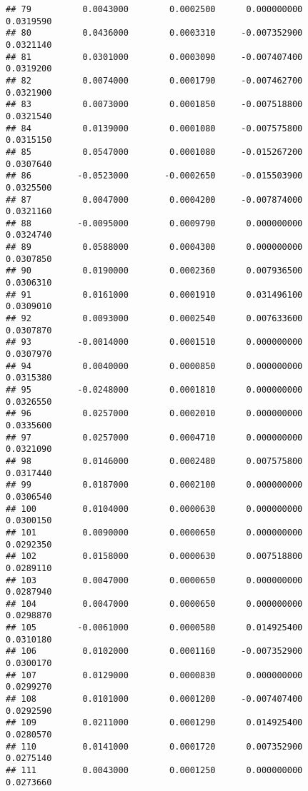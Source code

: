 \documentclass[
]{article}
\begin{document}
\begin{verbatim}
## 79          0.0043000        0.0002500      0.000000000             0.0319590
## 80          0.0436000        0.0003310     -0.007352900             0.0321140
## 81          0.0301000        0.0003090     -0.007407400             0.0319200
## 82          0.0074000        0.0001790     -0.007462700             0.0321900
## 83          0.0073000        0.0001850     -0.007518800             0.0321540
## 84          0.0139000        0.0001080     -0.007575800             0.0315150
## 85          0.0547000        0.0001080     -0.015267200             0.0307640
## 86         -0.0523000       -0.0002650     -0.015503900             0.0325500
## 87          0.0047000        0.0004200     -0.007874000             0.0321160
## 88         -0.0095000        0.0009790      0.000000000             0.0324740
## 89          0.0588000        0.0004300      0.000000000             0.0307850
## 90          0.0190000        0.0002360      0.007936500             0.0306310
## 91          0.0161000        0.0001910      0.031496100             0.0309010
## 92          0.0093000        0.0002540      0.007633600             0.0307870
## 93         -0.0014000        0.0001510      0.000000000             0.0307970
## 94          0.0040000        0.0000850      0.000000000             0.0315380
## 95         -0.0248000        0.0001810      0.000000000             0.0326550
## 96          0.0257000        0.0002010      0.000000000             0.0335600
## 97          0.0257000        0.0004710      0.000000000             0.0321090
## 98          0.0146000        0.0002480      0.007575800             0.0317440
## 99          0.0187000        0.0002100      0.000000000             0.0306540
## 100         0.0104000        0.0000630      0.000000000             0.0300150
## 101         0.0090000        0.0000650      0.000000000             0.0292350
## 102         0.0158000        0.0000630      0.007518800             0.0289110
## 103         0.0047000        0.0000650      0.000000000             0.0287940
## 104         0.0047000        0.0000650      0.000000000             0.0298870
## 105        -0.0061000        0.0000580      0.014925400             0.0310180
## 106         0.0102000        0.0001160     -0.007352900             0.0300170
## 107         0.0129000        0.0000830      0.000000000             0.0299270
## 108         0.0101000        0.0001200     -0.007407400             0.0292590
## 109         0.0211000        0.0001290      0.014925400             0.0280570
## 110         0.0141000        0.0001720      0.007352900             0.0275140
## 111         0.0043000        0.0001250      0.000000000             0.0273660

\end{verbatim}
\end{document}
